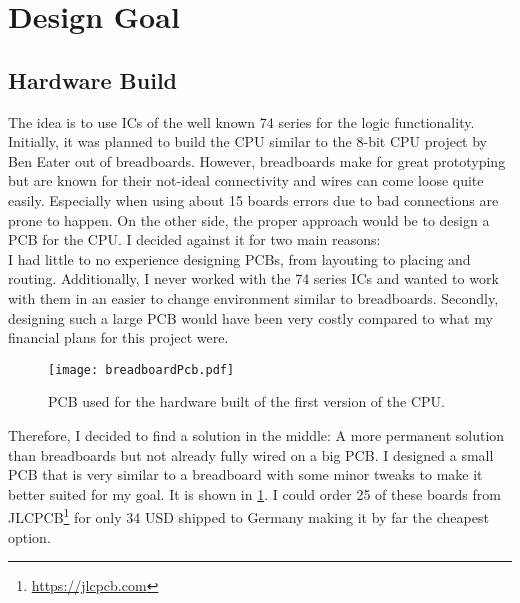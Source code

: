 
\section{Design Goal}
\subsection{Hardware Build}
The idea is to use \glspl{IC} of the well known 74 series for the logic functionality.
Initially, it was planned to build the \gls{CPU} similar to the 8-bit CPU project by Ben Eater \cite{eater_cpu} out of breadboards.
However, breadboards make for great prototyping but are known for their not-ideal connectivity and wires can come loose quite easily.
Especially when using about 15 boards errors due to bad connections are prone to happen.
On the other side, the proper approach would be to design a \gls{PCB} for the \gls{CPU}.
I decided against it for two main reasons:\\
I had little to no experience designing \glspl{PCB}, from layouting to placing and routing.
Additionally, I never worked with the 74 series \glspl{IC} and wanted to work with them in an easier to change environment similar to breadboards.
Secondly, designing such a large \gls{PCB} would have been very costly compared to what my financial plans for this project were.

\begin{figure}[t]
  \centering
  \texttt{[image: breadboardPcb.pdf]}
  \caption{\gls{PCB} used for the hardware built of the first version of the \gls{CPU}.}
  \label{fig:breadboardPcb}
\end{figure}
Therefore, I decided to find a solution in the middle: A more permanent solution than breadboards but not already fully wired on a big \gls{PCB}.
I designed a small \gls{PCB} that is very similar to a breadboard with some minor tweaks to make it better suited for my goal.
It is shown in \cref{fig:breadboardPcb}.
I could order 25 of these boards from JLCPCB\footnote{\url{https://jlcpcb.com}} for only 34 USD shipped to Germany making it by far the cheapest option.

